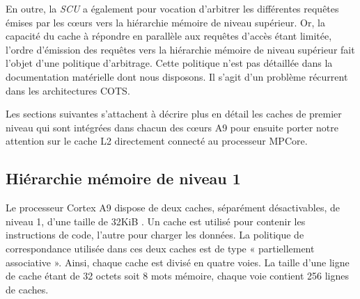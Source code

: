         En outre, la \emph{SCU} a également pour vocation d'arbitrer les différentes requêtes émises par les cœurs vers la hiérarchie mémoire de niveau supérieur. Or, la capacité du cache à répondre en parallèle aux requêtes d'accès étant limitée, l'ordre d'émission des requêtes vers la hiérarchie mémoire de niveau supérieur fait l'objet d'une politique d'arbitrage.
        Cette politique n'est pas détaillée dans la documentation matérielle dont nous disposons.
        Il s'agit d'un problème récurrent dans les architectures COTS.


        Les sections suivantes s'attachent à décrire plus en détail les caches de premier niveau qui sont intégrées dans chacun des cœurs A9 pour ensuite porter notre attention sur le cache L2 directement connecté au processeur MPCore.

    \subsection{Hiérarchie mémoire de niveau 1}


        Le processeur Cortex A9 dispose de deux caches, séparément désactivables, de niveau 1, d'une taille de 32KiB \cite{manuel:i_MX_6Dual_6Quad_applications_processor_reference_manual,manuel:cortex_A9_technical_reference_manual}.
        Un cache est utilisé pour contenir les instructions de code, l'autre pour charger les données. La politique de correspondance utilisée dans ces deux caches est de type « partiellement associative ».
        Ainsi, chaque cache est divisé en quatre voies. La taille d'une ligne de cache étant de 32 octets soit 8 mots mémoire, chaque voie contient 256 lignes de caches.

